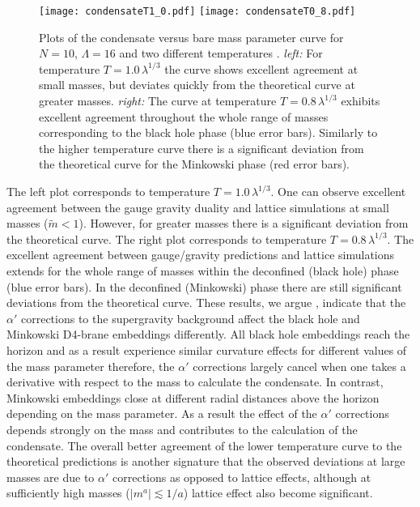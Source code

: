 \documentclass[a4paper]{jpconf}
\begin{document}
\begin{figure}[t] %
   \centering
      \texttt{[image: condensateT1\_0.pdf]} 
   \texttt{[image: condensateT0\_8.pdf]} 
 \caption{\small Plots of the condensate versus bare mass parameter curve for $N=10$, $\Lambda =16$ and two different temperatures . {\it left:} For temperature $T = 1.0\,\lambda^{1/3}$ the curve shows excellent agreement at small masses, but deviates quickly from the theoretical curve at greater masses. {\it right:} The curve at temperature $T = 0.8\,\lambda^{1/3}$ exhibits excellent agreement throughout the whole range of masses corresponding to the black hole phase (blue error bars). Similarly to the higher temperature curve there is a significant deviation from the theoretical curve for the Minkowski phase (red error bars).} 
   \label{fig:3}
\end{figure}
%
The left plot corresponds to temperature $T = 1.0\,\lambda^{1/3}$. One
can observe excellent agreement between the gauge gravity duality and
lattice simulations at small masses ($\tilde m < 1$). However, for
greater masses there is a significant deviation from the theoretical
curve. The right plot corresponds to temperature $T =
0.8\,\lambda^{1/3}$. The excellent agreement between gauge/gravity
predictions and lattice simulations extends for the whole range of
masses within the deconfined (black hole) phase (blue error bars). In
the deconfined (Minkowski) phase there are still significant
deviations from the theoretical curve. These results, we argue
\cite{Filev:2015cmz},
indicate that the $\alpha'$ corrections to the supergravity background
affect the black hole and Minkowski D4-brane embeddings
differently. All black hole embeddings reach the horizon and as a
result experience similar curvature effects for different values of
the mass parameter therefore, the $\alpha'$ corrections largely cancel
when one takes a derivative with respect to the mass to calculate the
condensate. In contrast, Minkowski embeddings close at different
radial distances above the horizon depending on the mass parameter. As
a result the effect of the $\alpha'$ corrections depends strongly on
the mass and contributes to the calculation of the condensate. The
overall better agreement of the lower temperature curve to the
theoretical predictions is another signature that the observed
deviations at large masses are due to $\alpha'$ corrections as opposed
to lattice effects, although at sufficiently high masses ($|m^a|
\lesssim 1/a$) lattice effect also become significant.
\end{document}
